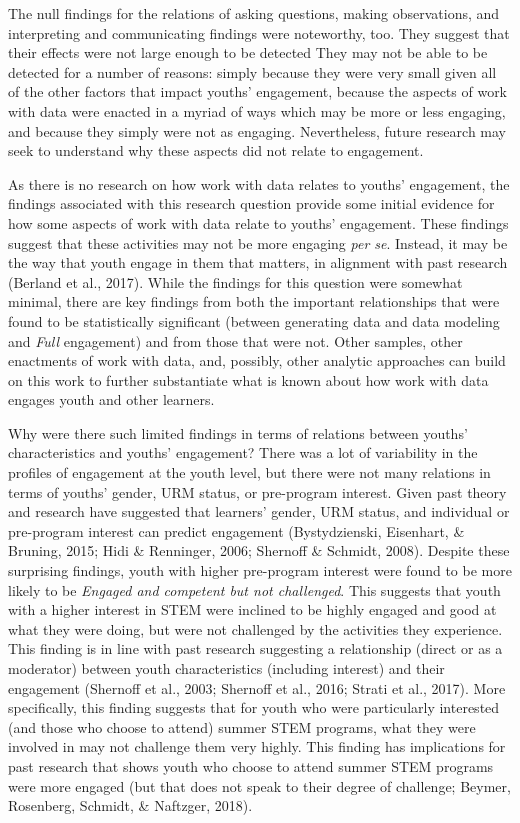 \documentclass[]{msu-thesis}
\theoremstyle{definition}
\theoremstyle{definition}
\theoremstyle{definition}
\theoremstyle{remark}
\begin{document}
The null findings for the relations of asking questions, making
observations, and interpreting and communicating findings were
noteworthy, too. They suggest that their effects were not large enough
to be detected They may not be able to be detected for a number of
reasons: simply because they were very small given all of the other
factors that impact youths' engagement, because the aspects of work with
data were enacted in a myriad of ways which may be more or less
engaging, and because they simply were not as engaging. Nevertheless,
future research may seek to understand why these aspects did not relate
to engagement.

As there is no research on how work with data relates to youths'
engagement, the findings associated with this research question provide
some initial evidence for how some aspects of work with data relate to
youths' engagement. These findings suggest that these activities may not
be more engaging \emph{per se}. Instead, it may be the way that youth
engage in them that matters, in alignment with past research (Berland et
al., 2017). While the findings for this question were somewhat minimal,
there are key findings from both the important relationships that were
found to be statistically significant (between generating data and data
modeling and \emph{Full} engagement) and from those that were not. Other
samples, other enactments of work with data, and, possibly, other
analytic approaches can build on this work to further substantiate what
is known about how work with data engages youth and other learners.

Why were there such limited findings in terms of relations between
youths' characteristics and youths' engagement? There was a lot of
variability in the profiles of engagement at the youth level, but there
were not many relations in terms of youths' gender, URM status, or
pre-program interest. Given past theory and research have suggested that
learners' gender, URM status, and individual or pre-program interest can
predict engagement (Bystydzienski, Eisenhart, \& Bruning, 2015; Hidi \&
Renninger, 2006; Shernoff \& Schmidt, 2008). Despite these surprising
findings, youth with higher pre-program interest were found to be more
likely to be \emph{Engaged and competent but not challenged}. This
suggests that youth with a higher interest in STEM were inclined to be
highly engaged and good at what they were doing, but were not challenged
by the activities they experience. This finding is in line with past
research suggesting a relationship (direct or as a moderator) between
youth characteristics (including interest) and their engagement
(Shernoff et al., 2003; Shernoff et al., 2016; Strati et al., 2017).
More specifically, this finding suggests that for youth who were
particularly interested (and those who choose to attend) summer STEM
programs, what they were involved in may not challenge them very highly.
This finding has implications for past research that shows youth who
choose to attend summer STEM programs were more engaged (but that does
not speak to their degree of challenge; Beymer, Rosenberg, Schmidt, \&
Naftzger, 2018).
\end{document}

